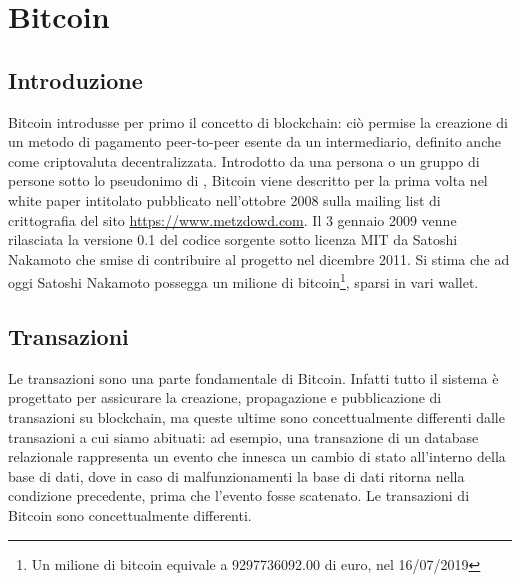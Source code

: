 \chapter{Bitcoin}
\label{chap:bitcoin}

\section{Introduzione}
\label{sec:introduzione}

Bitcoin introdusse per primo il concetto di blockchain: ciò permise la creazione di un metodo di pagamento peer-to-peer esente da un intermediario, definito anche come criptovaluta decentralizzata.
Introdotto da una persona o un gruppo di persone sotto lo pseudonimo di , Bitcoin viene descritto per la prima volta nel white paper intitolato  pubblicato nell’ottobre 2008 sulla mailing list di crittografia del sito \url{https://www.metzdowd.com}.\newline
Il 3 gennaio 2009 venne rilasciata la versione 0.1 del codice sorgente sotto licenza MIT da Satoshi Nakamoto che smise di contribuire al progetto nel dicembre 2011. Si stima che ad oggi Satoshi Nakamoto possegga un milione di bitcoin\footnote{Un milione di bitcoin equivale a 9297736092.00 di euro, nel 16/07/2019}, sparsi in vari wallet.

\section{Transazioni}
\label{sec:transazioniBitcoin}

Le transazioni sono una parte fondamentale di Bitcoin. Infatti tutto il sistema è progettato per assicurare la creazione, propagazione e pubblicazione di transazioni su blockchain, ma queste ultime sono concettualmente differenti dalle transazioni a cui siamo abituati: ad esempio, una transazione di un database relazionale rappresenta un evento che innesca un cambio di stato all’interno della base di dati, dove in caso di malfunzionamenti la base di dati ritorna nella condizione precedente, prima che l’evento fosse scatenato.
Le transazioni di Bitcoin sono concettualmente differenti.


